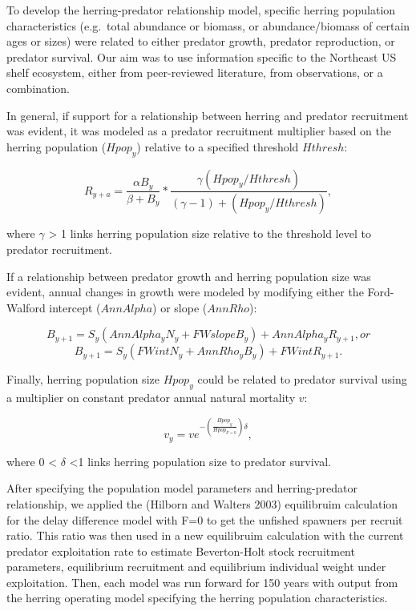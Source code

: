 \documentclass[]{article}
\begin{document}
To develop the herring-predator relationship model, specific herring
population characteristics (e.g.~total abundance or biomass, or
abundance/biomass of certain ages or sizes) were related to either
predator growth, predator reproduction, or predator survival. Our aim
was to use information specific to the Northeast US shelf ecosystem,
either from peer-reviewed literature, from observations, or a
combination.

In general, if support for a relationship between herring and predator
recruitment was evident, it was modeled as a predator recruitment
multiplier based on the herring population (\(Hpop_{y}\)) relative to a
specified threshold \(Hthresh\):

\begin{equation}
R_{y+a} = \frac{\alpha B_{y}}{\beta + B_{y}} * \frac{\gamma(Hpop_{y}/Hthresh)}{(\gamma-1)+(Hpop_{y}/Hthresh)} \label{recwithherring_equation}, 
\end{equation}

where \(\gamma\) \textgreater{} 1 links herring population size relative
to the threshold level to predator recruitment.

If a relationship between predator growth and herring population size
was evident, annual changes in growth were modeled by modifying either
the Ford-Walford intercept (\(AnnAlpha\)) or slope (\(AnnRho\)):

\begin{equation}
B_{y+1} = S_{y} (AnnAlpha_{y} N_{y} + FWslope B_{y}) + AnnAlpha_{y}R_{y+1} \label{delaydiffB_equation}, or
\end{equation}\begin{equation}
B_{y+1} = S_{y} (FWint N_{y} + AnnRho_{y} B_{y}) + FWint R_{y+1} \label{delaydiffB_equation}.
\end{equation}

Finally, herring population size \(Hpop_{y}\) could be related to
predator survival using a multiplier on constant predator annual natural
mortality \(v\):

\begin{equation}
v_{y} =  v e ^ {-(\frac{Hpop_{y}}{Hpop_{F=0}})\delta} \label{varmort_equation},
\end{equation}

where 0 \textless{} \(\delta\) \textless{}1 links herring population
size to predator survival.

After specifying the population model parameters and herring-predator
relationship, we applied the (Hilborn and Walters 2003) equilibruim
calculation for the delay difference model with F=0 to get the unfished
spawners per recruit ratio. This ratio was then used in a new
equilibruim calculation with the current predator exploitation rate to
estimate Beverton-Holt stock recruitment parameters, equilibrium
recruitment and equilibrium individual weight under exploitation. Then,
each model was run forward for 150 years with output from the herring
operating model specifying the herring population characteristics.
\end{document}
